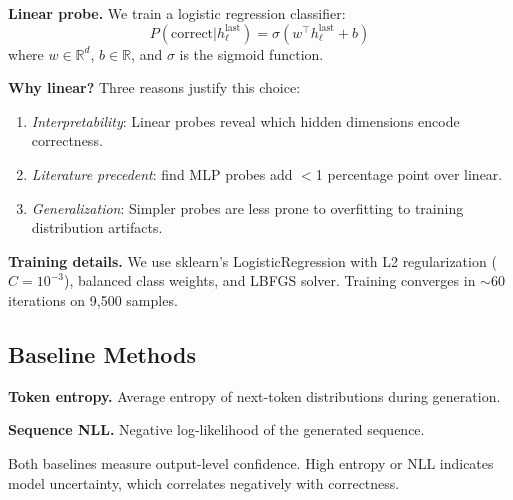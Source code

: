 \textbf{Linear probe.} We train a logistic regression classifier:
\begin{equation}
P(\text{correct} | h_\ell^{\text{last}}) = \sigma(w^\top h_\ell^{\text{last}} + b)
\end{equation}
where $w \in \mathbb{R}^d$, $b \in \mathbb{R}$, and $\sigma$ is the sigmoid function.

\textbf{Why linear?} Three reasons justify this choice:
\begin{enumerate}
    \item \emph{Interpretability}: Linear probes reveal which hidden dimensions encode correctness.
    \item \emph{Literature precedent}: \citet{kossen2024semantic} find MLP probes add $<$1 percentage point over linear.
    \item \emph{Generalization}: Simpler probes are less prone to overfitting to training distribution artifacts.
\end{enumerate}

\textbf{Training details.} We use sklearn's LogisticRegression with L2 regularization ($C = 10^{-3}$), balanced class weights, and LBFGS solver. Training converges in $\sim$60 iterations on 9,500 samples.

\subsection{Baseline Methods}

\textbf{Token entropy.} Average entropy of next-token distributions during generation.

\textbf{Sequence NLL.} Negative log-likelihood of the generated sequence.

Both baselines measure output-level confidence. High entropy or NLL indicates model uncertainty, which correlates negatively with correctness.
